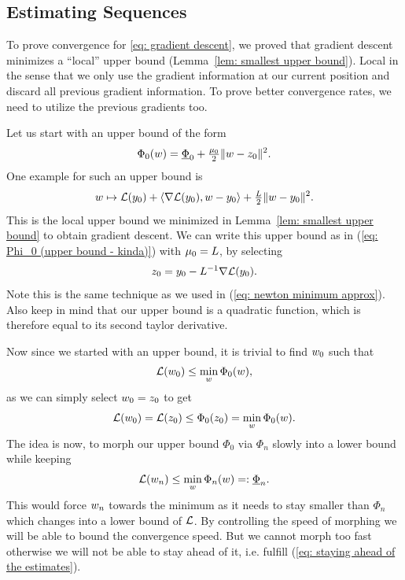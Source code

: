 \subsection{Estimating Sequences}

To prove convergence for \ref{eq: gradient descent}, we proved that gradient descent
minimizes a ``local'' upper bound (Lemma~\ref{lem: smallest upper bound}). Local
in the sense that we only use the gradient information at our current position
and discard all previous gradient information. To prove better convergence rates,
we need to utilize the previous gradients too.

Let us start with an upper bound of the form
%
\begin{align}\label{eq: Phi_0 (upper bound - kinda)}
	\Phi_0(w) = \underline{\Phi}_0 + \tfrac{\mu_0}{2}\|w-z_0\|^2.
\end{align}
%
One example for such an upper bound is
%
\begin{align*}
	w \mapsto
	\mathcal{L}(y_0)
	+ \langle\nabla\mathcal{L}(y_0), w - y_0\rangle
	+ \tfrac{L}{2}\|w -y_0\|^2.
\end{align*}
%
This is the local upper bound we minimized in Lemma~\ref{lem: smallest upper
bound} to obtain gradient descent. We can write this upper bound as in
(\ref{eq: Phi_0 (upper bound - kinda)}) with \(\mu_0=L\), by selecting
%
\begin{align*}
	z_0 = y_0 - L^{-1}\nabla\mathcal{L}(y_0).
\end{align*}
Note this is the same technique as we used in (\ref{eq: newton minimum approx}).
Also keep in mind that our upper bound is a quadratic function, which is therefore
equal to its second taylor derivative.

Now since we started with an upper bound, it is trivial to find \(w_0\)
such that
\begin{align*}
	\mathcal{L}(w_0) \le \min_{w}\Phi_0(w),
\end{align*}
as we can simply select \(w_0=z_0\) to get
\begin{align*}
	\mathcal{L}(w_0) =\mathcal{L}(z_0) \le \Phi_0(z_0) = \min_{w}\Phi_0(w).
\end{align*}
The idea is now, to morph our upper bound \(\Phi_0\) via \(\Phi_n\) slowly into
a lower bound while keeping 
\begin{align}\label{eq: staying ahead of the estimates}
	\mathcal{L}(w_n) \le \min_{w}\Phi_n(w)=:\underline{\Phi}_n.
\end{align}
This would force \(w_n\) towards the minimum as it needs to stay smaller
than \(\Phi_n\) which changes into a lower bound of \(\mathcal{L}\). By controlling
the speed of morphing we will be able to bound the convergence speed. But we
cannot morph too fast otherwise we will not be able to stay ahead of it, i.e.
fulfill (\ref{eq: staying ahead of the estimates}). 

